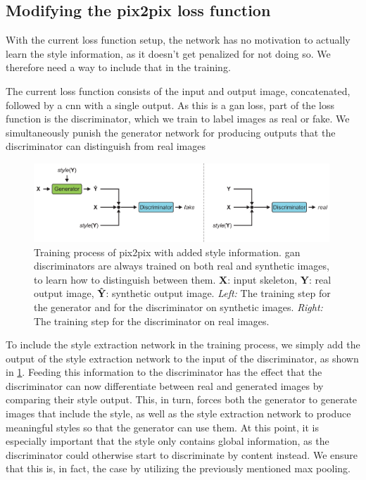 \subsection{Modifying the pix2pix loss function}
With the current loss function setup, the network has no motivation to actually learn the style information, as it doesn't get penalized for not doing so. We therefore need a way to include that in the training.

The current loss function consists of the input and output image, concatenated, followed by a \gls{cnn} with a single output. As this is a \gls{gan} loss, part of the loss function is the discriminator, which we train to label images as real or fake. We simultaneously punish the generator network for producing outputs that the discriminator can distinguish from real images


\begin{figure}
  \centering
  \includegraphics[width=0.99\textwidth]{../assets/pen_style_transfer/modifiedPix2PixTraining.pdf}
  \caption[Training process of \gls{pix2pix} with added style information]{Training process of \gls{pix2pix} with added style information. \gls{gan} discriminators are always trained on both real and synthetic images, to learn how to distinguish between them. \textbf{X}: input skeleton, \textbf{Y}: real output image, \textbf{\^{Y}}: synthetic output image. \emph{Left:} The training step for the generator and for the discriminator on synthetic images. \emph{Right:} The training step for the discriminator on real images.}
  \label{fig:modifiedConditionalPix2PixTraining}
\end{figure}

To include the style extraction network in the training process, we simply add the output of the style extraction network to the input of the discriminator, as shown in \cref{fig:modifiedConditionalPix2PixTraining}. Feeding this information to the discriminator has the effect that the discriminator can now differentiate between real and generated images by comparing their style output. This, in turn, forces both the generator to generate images that include the style, as well as the style extraction network to produce meaningful styles so that the generator can use them. At this point, it is especially important that the style only contains global information, as the discriminator could otherwise start to discriminate by content instead. We ensure that this is, in fact, the case by utilizing the previously mentioned max pooling.



